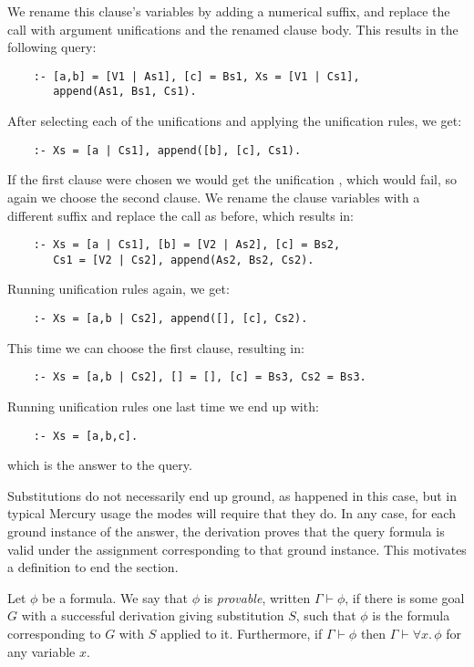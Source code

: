 We rename this clause's variables by adding a numerical suffix,
and replace the call with argument unifications
and the renamed clause body.
This results in the following query:
\begin{verbatim}
    :- [a,b] = [V1 | As1], [c] = Bs1, Xs = [V1 | Cs1],
       append(As1, Bs1, Cs1).
\end{verbatim}
After selecting each of the unifications
and applying the unification rules,
we get:
\begin{verbatim}
    :- Xs = [a | Cs1], append([b], [c], Cs1).
\end{verbatim}
If the first clause were chosen
we would get the unification \co{[b] = []},
which would fail,
so again we choose the second clause.
We rename the clause variables with a different suffix
and replace the call as before,
which results in:
\begin{verbatim}
    :- Xs = [a | Cs1], [b] = [V2 | As2], [c] = Bs2,
       Cs1 = [V2 | Cs2], append(As2, Bs2, Cs2).
\end{verbatim}
Running unification rules again, we get:
\begin{verbatim}
    :- Xs = [a,b | Cs2], append([], [c], Cs2).
\end{verbatim}
This time we can choose the first clause,
resulting in:
\begin{verbatim}
    :- Xs = [a,b | Cs2], [] = [], [c] = Bs3, Cs2 = Bs3.
\end{verbatim}
Running unification rules one last time we end up with:
\begin{verbatim}
    :- Xs = [a,b,c].
\end{verbatim}
which is the answer to the query.

Substitutions do not necessarily end up ground,
as happened in this case,
but in typical Mercury usage
the modes will require that they do.
In any case,
for each ground instance of the answer,
the derivation proves that the query formula is valid
under the assignment corresponding to that ground instance.
This motivates a definition to end the section.

\begin{definition}[Provability]
Let $\phi$ be a formula.
We say that $\phi$ is \emph{provable\label{gi:provable}},
written $\Gamma \vdash \phi$,
if there is some goal $G$
with a successful derivation giving substitution $S$,
such that $\phi$ is the formula corresponding to
$G$ with $S$ applied to it.
Furthermore,
if $\Gamma \vdash \phi$
then $\Gamma \vdash \forall x.\, \phi$
for any variable $x$.
\end{definition}


